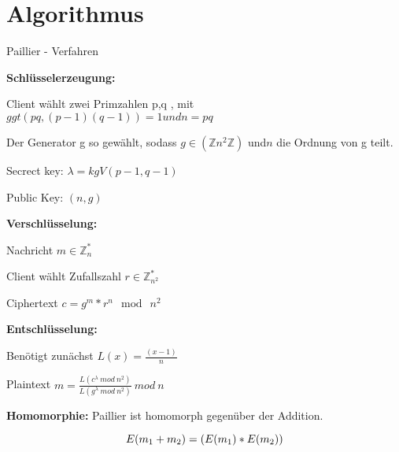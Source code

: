 \documentclass{beamer}
\begin{document}
\section{Algorithmus}


\begin{frame}{Paillier - Verfahren}

	\textbf{Schlüsselerzeugung:}\\
	
	\begin{arrowlist}
	\item Client wählt zwei Primzahlen p,q , mit $ ggt(pq, (p-1)(q-1))= 1 und n =pq $  
	\item Der Generator g so gewählt, sodass $ g \in (\mathbb{Z} n^{2} \mathbb{Z}) $ und$ n $ die Ordnung von g teilt.	
	\item Secrect key: $ \lambda = kgV(p-1, q-1) $
	\item Public Key: $(n,g)$	
	\end{arrowlist}
	
	

\end{frame}

\begin{frame}
		\textbf{Verschlüsselung:}
		\begin{arrowlist}
			\item Nachricht  $ m \in \mathbb{Z}_{n}^{*} $
			\item Client wählt Zufallszahl $ r  \in \mathbb{Z}_{n^{2}}^{*} $ 
			\item Ciphertext $ c = g^{m}*r^{n} \mod\ n^{2} $
		\end{arrowlist}
		

		\textbf{Entschlüsselung:}
		\begin{arrowlist}
			\item Benötigt zunächst $ L(x)= \frac{(x-1)}{n} $
			\item Plaintext $ m = \frac{L(c^{\lambda} \ mod \ n^{2}) }{L(g^{\lambda} \ mod \ n^{2})} \ mod \ n $
		\end{arrowlist}


		\textbf{Homomorphie:}
		Paillier ist homomorph gegenüber der Addition.
		
		$$ E(m \textsubscript{1} + m \textsubscript{2}) = (E(m \textsubscript{1}) * E(m \textsubscript{2}))$$
\end{frame}
\end{document}
